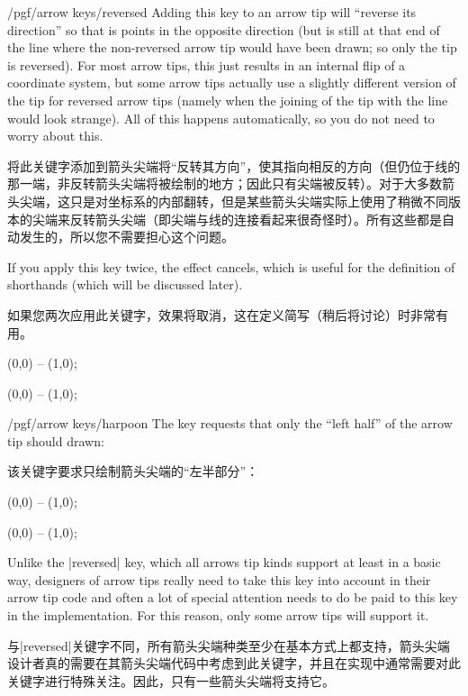 \begin{key}{/pgf/arrow keys/reversed}
    Adding this key to an arrow tip will ``reverse its direction'' so that is
    points in the opposite direction (but is still at that end of the line
    where the non-reversed arrow tip would have been drawn; so only the tip is
    reversed). For most arrow tips, this just results in an internal flip of a
    coordinate system, but some arrow tips actually use a slightly different
    version of the tip for reversed arrow tips (namely when the joining of the
    tip with the line would look strange). All of this happens automatically,
    so you do not need to worry about this.

    将此关键字添加到箭头尖端将“反转其方向”，使其指向相反的方向（但仍位于线的那一端，非反转箭头尖端将被绘制的地方；因此只有尖端被反转）。对于大多数箭头尖端，这只是对坐标系的内部翻转，但是某些箭头尖端实际上使用了稍微不同版本的尖端来反转箭头尖端（即尖端与线的连接看起来很奇怪时）。所有这些都是自动发生的，所以您不需要担心这个问题。

    If you apply this key twice, the effect cancels, which is useful for the
    definition of shorthands (which will be discussed later).

    如果您两次应用此关键字，效果将取消，这在定义简写（稍后将讨论）时非常有用。
\begin{codeexample}[width=3cm,preamble={\usetikzlibrary{arrows.meta}}]
 \draw [arrows = {-Stealth[reversed]}] (0,0) -- (1,0);
\end{codeexample}
\begin{codeexample}[width=3cm,preamble={\usetikzlibrary{arrows.meta}}]
 \draw [arrows = {-Stealth[reversed, reversed]}] (0,0) -- (1,0);
\end{codeexample}
\end{key}

\begin{key}{/pgf/arrow keys/harpoon}
    The key requests that only the ``left half'' of the arrow tip should drawn:
    
    该关键字要求只绘制箭头尖端的“左半部分”：
\begin{codeexample}[width=3cm,preamble={\usetikzlibrary{arrows.meta}}]
 \draw [arrows = {-Stealth[harpoon]}] (0,0) -- (1,0);
\end{codeexample}
\begin{codeexample}[width=3cm,preamble={\usetikzlibrary{arrows.meta}}]
 \draw [arrows = {->[harpoon]}] (0,0) -- (1,0);
\end{codeexample}
    Unlike the |reversed| key, which all arrows tip kinds support at least in a
    basic way, designers of arrow tips really need to take this key into
    account in their arrow tip code and often a lot of special attention needs
    to do be paid to this key in the implementation. For this reason, only some
    arrow tips will support it.

    与|reversed|关键字不同，所有箭头尖端种类至少在基本方式上都支持，箭头尖端设计者真的需要在其箭头尖端代码中考虑到此关键字，并且在实现中通常需要对此关键字进行特殊关注。因此，只有一些箭头尖端将支持它。
\end{key}

